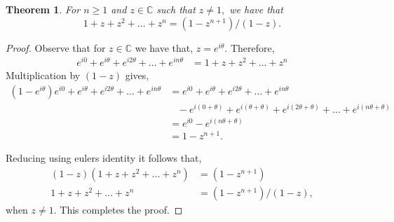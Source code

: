 \documentclass[letter]{article}
\newtheorem{theorem}{Theorem}
\newenvironment{menumerate}{%
  \edef\backupindent{\the\parindent}%
  \enumerate%
  \setlength{\parindent}{\backupindent}%
}{\endenumerate}
\begin{document}
\begin{menumerate}
        \begin{theorem}
            For $n\geq 1$ and $z \in \mathbb{C}$ such that $z \neq 1,$ we have that
            \begin{equation}
                1 +z + z^2 + \dots + z^n = (1-z^{n+1})/(1-z).
            \end{equation}
        \end{theorem}
        \begin{proof}
            Observe that for $z \in \mathbb{C}$ we have that, $z = e^{i\theta}.$ Therefore,
            \begin{equation}
                \begin{aligned}
                    e^{i0} + e^{i\theta} + e^{i2\theta} + \dots + e^{in\theta} &= 1 +z + z^2 + \dots + z^n
                \end{aligned}
            \end{equation}
            Multiplication by $(1 -z)$ gives, 
            \begin{equation}
                \begin{aligned}
                    (1-e^{i\theta})e^{i0} + e^{i\theta} + e^{i2\theta} + \dots + e^{in\theta} &= e^{i0} + e^{i\theta} + e^{i2\theta} + \dots + e^{in\theta}\\
                    &\;\;\; - e^{i(0 + \theta)} + e^{i(\theta + \theta)} + e^{i(2\theta+\theta)} + \dots + e^{i(n\theta + \theta)} \\
                    &= e^{i0} - e^{i(n\theta + \theta)} \\
                    &= 1 - z^{n+1}.
                \end{aligned}
            \end{equation}

            Reducing using eulers identity it follows that,
            \begin{equation}
                \begin{aligned}
                    (1-z)(1 +z + z^2 + \dots + z^n) &= (1-z^{n+1})\\
                    1 +z + z^2 + \dots + z^n &= (1-z^{n+1})/(1-z),
                \end{aligned}
            \end{equation}
            when $z \neq 1.$ This completes the proof.
        \end{proof}


\end{menumerate}
\end{document}
